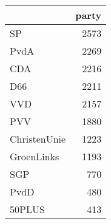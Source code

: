 \begin{tabular}{lr}
\toprule
{} &  party \\
\midrule
SP           &   2573 \\
PvdA         &   2269 \\
CDA          &   2216 \\
D66          &   2211 \\
VVD          &   2157 \\
PVV          &   1880 \\
ChristenUnie &   1223 \\
GroenLinks   &   1193 \\
SGP          &    770 \\
PvdD         &    480 \\
50PLUS       &    413 \\
\bottomrule
\end{tabular}
